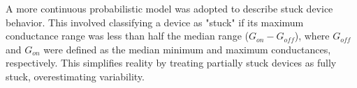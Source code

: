



\noindent A more continuous probabilistic model was adopted to describe stuck device behavior. This involved classifying a device as "stuck" if its maximum conductance range was less than half the median range ($G_{on} - G_{off}$), where $G_{off}$ and $G_{on}$ were defined as the median minimum and maximum conductances, respectively. This simplifies reality by treating partially stuck devices as fully stuck, overestimating variability.\\



